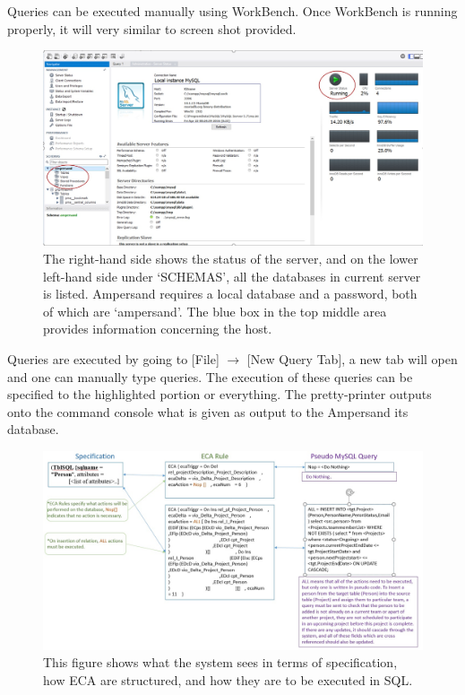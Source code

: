 Queries can be executed manually using WorkBench.
Once WorkBench is running properly, it will  very 
similar to screen shot provided.
\begin{figure}[!h]
    \includegraphics[width=\textwidth]{images/WorkBench}
    \caption{\footnotesize{The right-hand side shows the status of the server, 
    and on the lower left-hand side under `SCHEMAS', all the databases in 
    current server is listed. Ampersand requires a local database and a 
    password, both of which are `ampersand'. The blue box in the top middle 
    area provides information concerning the host. }}
\end{figure}

Queries are executed by going to [File] $\rightarrow$ [New Query Tab], a new 
tab will open and one can manually type queries. The execution of these queries 
can be specified to the highlighted portion or everything. The pretty-printer 
outputs onto the command console what is given as output to the Ampersand its 
database. 

\begin{figure}[!h]
    \includegraphics[width=\textwidth]{images/sqlquery}
    \caption{\footnotesize{This figure shows what the system sees in terms of 
    specification, how ECA are structured, and how they are to be executed in 
    SQL. }}
\end{figure}





